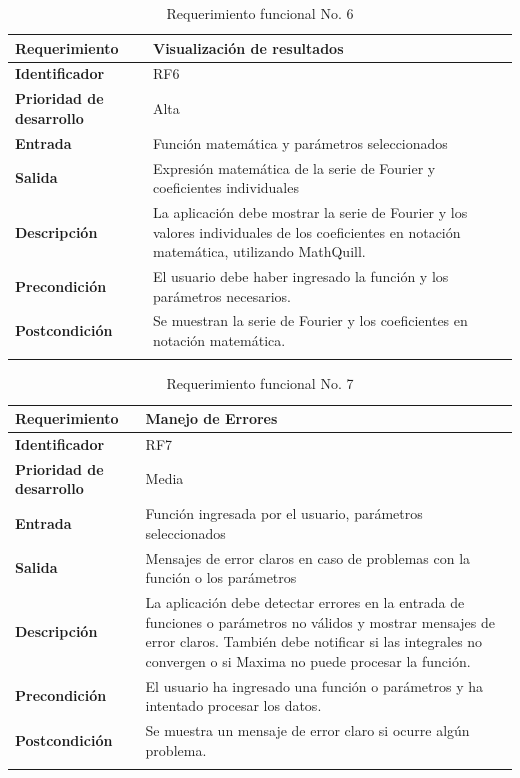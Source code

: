 \begin{longtable}{|m{3.5cm}|m{9.5cm}|}
	\hline
	\rowcolor{black!75} \color{white}\textbf{Requerimiento} & \color{white}\textbf{Visualización de resultados} \\
	\hline
	\textbf{Identificador} & RF6 \\
	\hline
	\textbf{Prioridad de desarrollo} & Alta \\
	\hline
	\textbf{Entrada} & Función matemática y parámetros seleccionados \\
	\hline
	\textbf{Salida} & Expresión matemática de la serie de Fourier y coeficientes individuales \\
	\hline
	\textbf{Descripción} & La aplicación debe mostrar la serie de Fourier y los valores individuales de los coeficientes en notación matemática, utilizando MathQuill. \\
	\hline
	\textbf{Precondición} & El usuario debe haber ingresado la función y los parámetros necesarios. \\
	\hline
	\textbf{Postcondición} & Se muestran la serie de Fourier y los coeficientes en notación matemática. \\
	\hline
	\rowcolor{white} \caption{Requerimiento funcional No. 6} \label{tabla:RF6} \\
\end{longtable}


\begin{longtable}{|m{3.5cm}|m{9.5cm}|}
	\hline
	\rowcolor{black!75} \color{white}\textbf{Requerimiento} & \color{white}\textbf{Manejo de Errores} \\
	\hline
	\textbf{Identificador} & RF7 \\
	\hline
	\textbf{Prioridad de desarrollo} & Media \\
	\hline
	\textbf{Entrada} & Función ingresada por el usuario, parámetros seleccionados \\
	\hline
	\textbf{Salida} & Mensajes de error claros en caso de problemas con la función o los parámetros \\
	\hline
	\textbf{Descripción} & La aplicación debe detectar errores en la entrada de funciones o parámetros no válidos y mostrar mensajes de error claros. También debe notificar si las integrales no convergen o si Maxima no puede procesar la función. \\
	\hline
	\textbf{Precondición} & El usuario ha ingresado una función o parámetros y ha intentado procesar los datos. \\
	\hline
	\textbf{Postcondición} & Se muestra un mensaje de error claro si ocurre algún problema. \\
	\hline
	\rowcolor{white} \caption{Requerimiento funcional No. 7} \label{tabla:RF7} \\
\end{longtable}



